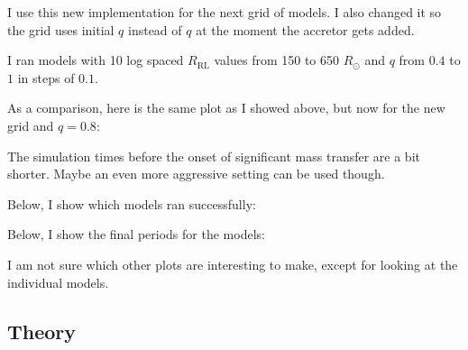\documentclass[a4paper,10pt]{article}
\begin{document}
I use this new implementation for the next grid of models. I also changed it so the grid uses initial \(q\) instead of \(q\) at the moment the accretor gets added.

I ran models with 10 log spaced \(R_\text{RL}\) values from 150 to 650 \(R_\odot \) and \(q\) from \(0.4\) to \(1\) in steps of \(0.1\).

As a comparison, here is the same plot as I showed above, but now for the new grid and \(q=0.8\):
\begin{figure}[ht]
    \centering
\end{figure}

The simulation times before the onset of significant mass transfer are a bit shorter. Maybe an even more aggressive setting can be used though.

Below, I show which models ran successfully:
\begin{figure}[ht]
    \centering
\end{figure}

Below, I show the final periods for the models:
\begin{figure}[ht]
    \centering
\end{figure}

\nextpage

\begin{figure}[ht]
    \centering
\end{figure}

\begin{figure}[ht]
    \centering
\end{figure}


I am not sure which other plots are interesting to make, except for looking at the individual models.




\subsection{Theory}
\end{document}
